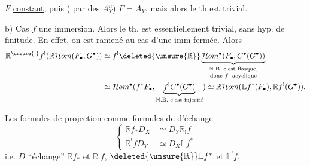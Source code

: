  $F$ \uline{constant}, puis ( par des $A_Y^n$) $F=A_Y$, mais alors le th est trivial.

b) Cas $f$ une immersion. Alors le th. est essentiellement trivial, sans hyp. de finitude.
En effet, on est ramené au cas d'une imm fermée. Alors
\[
\begin{aligned}
\mathbb R^{\unsure{!}}f^!(\mathbb R\mathcal Hom(F_\bullet,G^\bullet))
&\simeq f^!\deleted{\unsure{\mathbb R}}\underbrace{\mathcal Hom^\bullet(F_\bullet,C^\bullet(G^\bullet))}_{\substack{\text{N.B. c'est flasque,}\\\text{donc }f^!\text{-acyclique}}}\\
&\simeq \mathcal Hom^\bullet(f^*F_\bullet,\underbrace{f^!C^\bullet(G^\bullet)}_{\text{N.B. c'est injectif}})
\simeq\mathbb R\mathcal Hom(\mathbb Lf^*(F_\bullet),\mathbb R f^!(G^\bullet)).
\end{aligned}
\]


Les formules de projection  comme \uline{formules de}  \uline{d'échange}
\[
\left\{\begin{aligned}
\mathbb Rf_*D_X&\simeq D_Y\mathbb R_!f\\
\mathbb R^!fD_Y&\simeq D_X\mathbb Lf^*
\end{aligned}\right.
\]
i.e. $D$ ``échange'' $\mathbb Rf_*$ et $\mathbb R_!f$, $\deleted{\unsure{\mathbb R}}\mathbb Lf^*$ et $\mathbb L^!f$.

